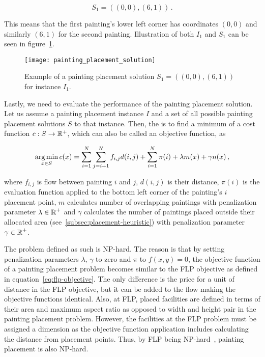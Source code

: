 \[
    S_1 = ((0,0), (6,1)) \,.
\]

This means that the first painting's lower left corner has coordinates $(0,0)$
and similarly $(6,1)$ for the second painting.
Illustration of both $I_1$ and $S_1$ can be seen in figure~\ref{fig:painting-placement-solution}.

\begin{figure}
    \texttt{[image: painting\_placement\_solution]}
    \caption[Example of a painting placement solution]{Example of a painting placement solution $S_1 = ((0,0), (6,1))$ for instance $I_1$.}
    \label{fig:painting-placement-solution}
\end{figure}

\newpage

Lastly, we need to evaluate the performance of the painting placement solution.
Let us assume a painting placement instance $I$ and a set of all possible painting placement solutions $S$ to that instance.
Then, the  is to find a minimum of a cost function $c: S \to \operatorname*{\mathbb{R}^+}$,
which can also be called an objective function, as


\begin{equation}
    \operatorname*{arg\,min}_{x \in S} c(x) = \sum\limits_{i=1}^N\sum\limits_{j=i+1}^N f_{i,j}d(i, j) + \sum\limits_{i=1}^N \pi(i) + \lambda m(x) + \gamma n(x) \,,
    \label{eq:objective}
\end{equation}

where $f_{i,j}$ is flow between painting $i$ and $j$, $d(i,j)$ is their distance,
$\pi(i)$ is the evaluation function applied to the bottom left corner of the painting's $i$  placement point,
$m$ calculates number of overlapping paintings with penalization parameter $\lambda \in \operatorname*{\mathbb{R}}^+$
and $\gamma$ calculates the number of paintings placed outside their allocated area (see~\ref{subsec:placement-heuristic})
with penalization parameter $\gamma \in \operatorname*{\mathbb{R}}^+$.

The problem defined as such is NP-hard.
The reason is that by setting penalization parameters $\lambda$, $\gamma$ to zero and $\pi$ to $f(x,y) = 0$,
the objective function of a painting placement problem becomes similar to the FLP objective as defined in equation~\ref{eq:flp-objective}.
The only difference is the price for a unit of distance in the FLP objective, but it can be added to the flow making the objective functions identical.
Also, at FLP, placed facilities are defined in terms of their area and maximum aspect ratio as opposed to width and height pair in the painting placement problem.
However, the facilities at the FLP problem must be assigned a dimension as the objective function application includes calculating the distance from placement points.
Thus, by FLP being NP-hard~\cite{liuMultiobjectiveParticleSwarm2018, goncalvesBiasedRandomkeyGenetic2015, friedrichIntegratedSlicingTree2018}, painting placement is also NP-hard.
